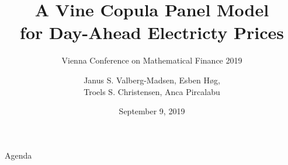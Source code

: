 \documentclass[10pt]{beamer}
\title{A Vine Copula Panel Model\\for Day-Ahead Electricty Prices}
\subtitle{Vienna Conference on Mathematical Finance 2019}
\author{
  Janus S. Valberg-Madsen,
  Esben Høg,\\
  Troels S. Christensen,
  Anca Pircalabu
}
\date{September 9, 2019}
\begin{document}
{\aauwavesbg
  \begin{frame}
    \titlepage
  \end{frame}
}

\begin{frame}{Agenda}{}
  \tableofcontents
\end{frame}








\end{document}

